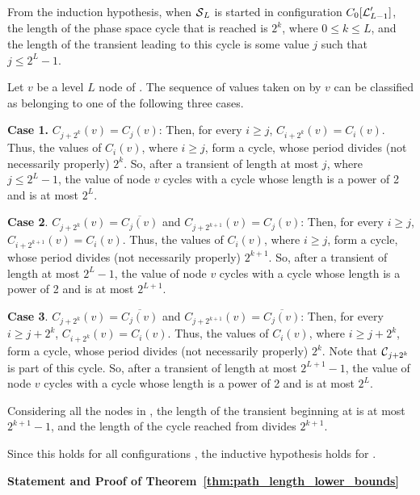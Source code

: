 From the induction hypothesis, when $\mbox{$\mathcal{S}$}_L$  is started in
configuration $C_0[\mbox{$\mathcal{L}$}_{L-1}']$, the length of the phase space
cycle that is reached is $2^k$, where $0 \leq k \leq L$, and the
length of the transient leading to this cycle is some value $j$
such that $j \leq 2^L-1$.

Let $v$ be a level $L$ node of \cals{}.
The sequence of values taken on by $v$ 
can be classified as belonging to one of the following three cases.

\smallskip

\noindent
{\bf Case 1.} $C_{j+2^k}(v) = C_j(v)$:
Then, for every $i \geq j$, $C_{i+2^k}(v) = C_i(v)$.  Thus, the
values of $C_i(v)$, where $i \geq j$, form a cycle, whose period
divides (not necessarily properly) $2^k$.  So, after a transient
of length at most $j$, where $j \leq 2^L-1$, the value of node $v$
cycles with a cycle whose length is a power of 2 and is at most
$2^L$.

\smallskip

\noindent
{\bf Case 2}. $C_{j+2^k}(v) = \overline{C_j(v)}$ and $C_{j+2^{k+1}}(v) = C_j(v)$:
Then, for every $i \geq j$, $C_{i+2^{k+1}}(v) = C_i(v)$.
Thus, the values of $C_i(v)$, where $i \geq j$, form a cycle, 
whose period divides (not necessarily properly) $2^{k+1}$.
So, after a transient of length at most $2^L-1$,
the value of node $v$ cycles with a cycle whose length is 
a power of 2 and is at most $2^{L+1}$.

\smallskip

\noindent
{\bf Case 3}. $C_{j+2^k}(v) = \overline{C_j(v)}$ 
and $C_{j+2^{k+1}}(v) = \overline{C_j(v)}$:
Then, for every $i \geq j + 2^k$, $C_{i+2^k}(v) = C_i(v)$.
Thus, the values of $C_i(v)$, where $i \geq j + 2^k$, form a cycle, 
whose period divides (not necessarily properly) $2^k$.
Note that  $\mbox{$\mathcal{C}$}_{j+2^k}$ is part of this cycle.
So, after a transient of length at most $2^{L+1}-1$,
the value of node $v$ cycles with a cycle whose length is 
a power of 2 and is at most $2^L$.


Considering all the nodes in \cals{}, the length of the transient
beginning at  \calc{} is at most $2^{k+1}-1$, and the length of the
cycle reached from  \calc{} divides $2^{k+1}$.

Since this holds for all configurations \calc{}, the inductive
hypothesis holds for \cals{}.  
\QED

\bigskip

\noindent
\textbf{Statement and Proof of Theorem~\ref{thm:path_length_lower_bounds}}

